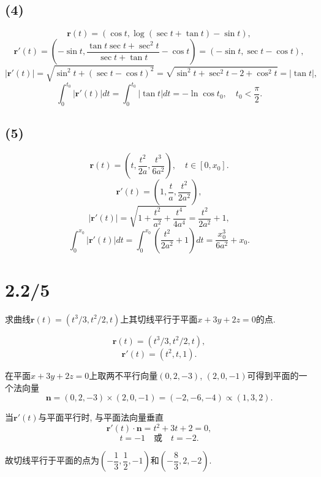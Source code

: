 \documentclass[11pt,a4paper]{article}
\begin{document}
\subsection*{(4)}

$$\mathbf{r}(t)=(\cos t, \log(\sec t+\tan t)-\sin t),$$
$$\mathbf{r}'(t)=\left(-\sin t, \frac{\tan t\sec t+\sec^2t}{\sec t+\tan t} -\cos t\right)=(-\sin t,\sec t-\cos t),$$
$$|\mathbf{r}'(t)|=\sqrt{\sin^2t+(\sec t-\cos t)^2}=\sqrt{\sin^2t+\sec^2t-2+\cos^2t}=|\tan t|,$$
$$\int_0^{t_0}|\mathbf{r}'(t)|dt=\int_0^{t_0}|\tan t|dt=-\ln\cos t_0,\quad t_0<\frac{\pi}{2}.$$

\subsection*{(5)}

$$\mathbf{r}(t)=\left(t,\frac{t^2}{2a},\frac{t^3}{6a^2}\right),
  \quad t\in[0,x_0].$$
$$\mathbf{r}'(t)=\left(1,\frac{t}{a},\frac{t^2}{2a^2}\right),$$
$$|\mathbf{r}'(t)|=\sqrt{1+\frac{t^2}{a^2}+\frac{t^4}{4a^4}}=\frac{t^2}{2a^2}+1,$$
$$\int_0^{x_0}|\mathbf{r}'(t)|dt=\int_0^{x_0}\left(\frac{t^2}{2a^2}+1\right)dt=\frac{x_0^3}{6a^2}+x_0.$$

\section{2.2/5}
\begin{problem}
  求曲线$\mathbf{r}(t)=(t^3/3,t^2/2,t)$上其切线平行于平面$x+3y+2z=0$的点.
\end{problem}

$$\mathbf{r}(t)=(t^3/3,t^2/2,t),$$
$$\mathbf{r}'(t)=(t^2,t,1).$$

在平面$x+3y+2z=0$上取两不平行向量$(0,2,-3)$, $(2,0,-1)$可得到平面的一个法向量
$$\mathbf{n}=(0,2,-3)\times(2,0,-1)=(-2,-6,-4)\propto(1,3,2).$$

当$\mathbf{r}'(t)$与平面平行时, 与平面法向量垂直
$$\mathbf{r}'(t)\cdot\mathbf{n}=t^2+3t+2=0,$$
$$t=-1\quad\text{或}\quad t=-2.$$

故切线平行于平面的点为$\left(-\dfrac{1}{3},\dfrac{1}{2},-1\right)$和$\left(-\dfrac{8}{3},2,-2\right)$.
\end{document}
